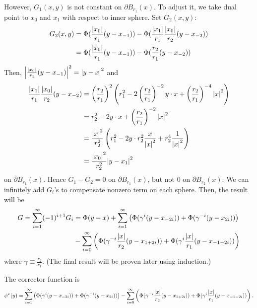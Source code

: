 \documentclass{article}
\begin{document}
However, $G_1(x,y)$ is not constant on $\partial B_{r_1}(x)$. To adjust it, we take dual point to $x_0$ and $x_1$ with respect to inner sphere. Set $G_2(x,y)$:
\begin{equation*}
\begin{split}
G_2(x,y)&=\Phi(\frac{\abs{x_0}}{r_1}(y-x_{-1}))-\Phi(\frac{\abs{x_1}}{r_1}\frac{\abs{x_0}}{r_2}(y-x_{-2}))\\
&=\Phi(\frac{\abs{x_0}}{r_1}(y-x_{-1}))-\Phi(\frac{r_2}{r_1}(y-x_{-2}))
\end{split}
\end{equation*}
Then, $\abs{\frac{\abs{x_0}}{r_1}(y-x_{-1})}^2=\abs{y-x}^2$ and
\begin{equation*}
\begin{split}
\frac{\abs{x_1}}{r_1}\frac{\abs{x_0}}{r_2}(y-x_{-2})&=\left(\frac{r_2}{r_1}\right)^2\left(r_1^2-2\left(\frac{r_2}{r_1}\right)^{-2}y\cdot x+\left(\frac{r_2}{r_1}\right)^{-4}\abs{x}^2\right)\\
&=r_2^2-2y\cdot x+\left(\frac{r_2}{r_1}\right)^{-2}\abs{x}^2\\
&=\frac{\abs{x}^2}{r_2^2}\left(r_1^2-2y\cdot r_2^2 \frac{x}{\abs{x}^2}+r_2^4\frac{1}{\abs{x}^2}\right)\\
&=\frac{\abs{x_0}^2}{r_2^2}\abs{y-x_1}^2
\end{split}
\end{equation*}
on $\partial B_{r_1}(x)$. Hence $G_1-G_2=0$ on $\partial B_{r_1}(x)$, but not $0$ on $\partial B_{r_2}(x)$. We can infinitely add $G_i$'s to compensate nonzero term on each sphere. Then, the result will be
\begin{equation*}\label{Eq:7-2}
\begin{split}
G=\sum\limits_{i=1}^\infty (-1)^{i+1} G_i&=\Phi(y-x)+\sum\limits_{i=1}^\infty\left(\Phi(\gamma^i (y-x_{-2i}))+\Phi(\gamma^{-i}(y-x_{2i}))\right) \\
&-\sum\limits_{i=0}^\infty \left(\Phi(\gamma^{-i} \frac{\abs{x}}{r_2}(y-x_{1+2i}))+\Phi(\gamma^i \frac{\abs{x}}{r_1}(y-x_{-1-2i}))\right)
\end{split}
\end{equation*}
where $\gamma\equiv \frac{r_2}{r_1}$. (The final result will be proven later using induction.)

The corrector function is
\begin{equation*}
\phi^x(y)=\sum\limits_{i=1}^\infty\left(\Phi(\gamma^i (y-x_{-2i}))+\Phi(\gamma^{-i}(y-x_{2i}))\right) -\sum\limits_{i=0}^\infty \left(\Phi(\gamma^{-i} \frac{\abs{x}}{r_2}(y-x_{1+2i}))+\Phi(\gamma^{i} \frac{\abs{x}}{r_1}(y-x_{-1-2i}))\right).
\end{equation*}
\end{document}
